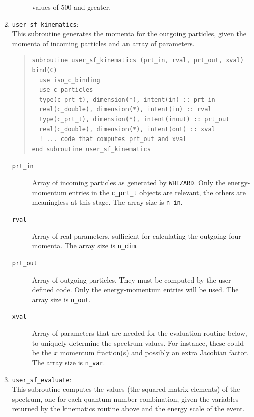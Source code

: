\documentclass[12pt]{book}
\newcommand{\ttt}[1]{\texttt{#1}}
\newcommand{\whizard}{\texttt{WHIZARD}}
\begin{document}
\begin{enumerate}
\begin{description}
    values of $500$ and greater.
  \end{description}
\item
  \ttt{user\_sf\_kinematics}:\\
  This subroutine generates the momenta for the outgoing particles,
  given the momenta of incoming particles and an array of parameters.
  \begin{quote}
  \begin{footnotesize}
\begin{verbatim}
subroutine user_sf_kinematics (prt_in, rval, prt_out, xval) bind(C)
  use iso_c_binding
  use c_particles
  type(c_prt_t), dimension(*), intent(in) :: prt_in
  real(c_double), dimension(*), intent(in) :: rval
  type(c_prt_t), dimension(*), intent(inout) :: prt_out
  real(c_double), dimension(*), intent(out) :: xval
  ! ... code that computes prt_out and xval
end subroutine user_sf_kinematics
\end{verbatim}
  \end{footnotesize}
  \end{quote}
  \begin{description}
  \item[\ttt{prt\_in}]  Array of incoming particles as generated by
    \whizard.  Only the energy-momentum entries in the \ttt{c\_prt\_t}
    objects are relevant, the others are meaningless at this stage.
    The array size is \ttt{n\_in}.
  \item[\ttt{rval}]  Array of real parameters, sufficient for
    calculating the outgoing four-momenta.  The array size is
    \ttt{n\_dim}.
  \item[\ttt{prt\_out}]  Array of outgoing particles.  They must be
    computed by the user-defined code.  Only the energy-momentum
    entries will be used.  The array size is \ttt{n\_out}.
  \item[\ttt{xval}]  Array of parameters that are needed for the
    evaluation routine below, to uniquely determine the spectrum
    values.  For instance, these could be the $x$ momentum fraction(s)
    and possibly an extra Jacobian factor.  The array size is
    \ttt{n\_var}.
  \end{description}
\item
  \ttt{user\_sf\_evaluate}:\\
  This subroutine computes the values (the squared matrix elements) of
  the spectrum, one for each quantum-number combination, given the
  variables returned by the kinematics routine above and the energy
  scale of the event.
  \begin{quote}

\end{quote}
\end{enumerate}
\end{document}
